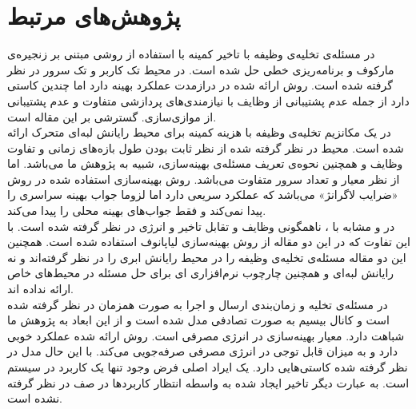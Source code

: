\section{پژوهش‌های مرتبط}
در \cite{Liu} مسئله‌ی تخلیه‌ی وظیفه با تاخیر کمینه با استفاده از روشی مبتنی بر زنجیره‌ی مارکوف و برنامه‌ریزی خطی حل شده است. در \CurrentProject محیط تک کاربر و تک سرور در نظر گرفته شده است. روش ارائه شده در درازمدت عملکرد بهینه دارد اما چندین کاستی دارد از جمله عدم پشتیبانی از وظایف با نیازمندی‌های پردازشی متفاوت و عدم پشتیبانی از موازی‌سازی. \CurrentProject گسترشی بر این مقاله است. \\

در \cite{samanta} یک مکانزیم تخلیه‌ی وظیفه با هزینه کمینه برای محیط رایانش لبه‌ای متحرک ارائه شده است. محیط در نظر گرفته شده از نظر ثابت بودن طول بازه‌های زمانی و تفاوت وظایف و همچنین نحوه‌ی تعریف مسئله‌ی بهینه‌سازی، شبیه به پژوهش ما می‌باشد. اما از نظر معیار و تعداد سرور متفاوت می‌باشد. روش بهینه‌سازی استفاده شده در \CurrentProject روش «ضرایب لاگرانژ» می‌باشد که عملکرد سریعی دارد اما لزوما جواب بهینه سراسری را پیدا نمی‌کند و فقط جواب‌های بهینه محلی را پیدا می‌کند. \\

در \cite{kwak} و \cite{jiang} مشابه با \CurrentProject، ناهمگونی وظایف و تقابل تاخیر و انرژی در نظر گرفته شده است. با این تفاوت که در این دو مقاله از روش بهینه‌سازی لیاپانوف استفاده شده است. همچنین این دو مقاله مسئله‌ی تخلیه‌ی وظیفه را در محیط رایانش ابری را در نظر گرفته‌اند و نه رایانش لبه‌ای و همچنین چارچوب نرم‌افزاری ای برای حل مسئله در محیط‌های خاص ارائه نداده اند. \\

در \cite{zhang2013} مسئله‌ی تخلیه و زمان‌بندی ارسال و اجرا به صورت همزمان در نظر گرفته شده است و کانال بیسیم به صورت تصادفی مدل شده است و از این ابعاد به پژوهش ما شباهت دارد. معیار بهینه‌سازی در \CurrentProject انرژی مصرفی است. روش ارائه شده عملکرد خوبی دارد و به میزان قابل توجی در انرژی مصرفی صرفه‌جویی می‌کند. با این حال مدل در نظر گرفته شده کاستی‌هایی دارد. یک ایراد اصلی فرض وجود تنها یک کاربرد در سیستم است. به عبارت دیگر تاخیر ایجاد شده به واسطه انتظار کاربردها در صف در نظر گرفته نشده است.

\clearpage

